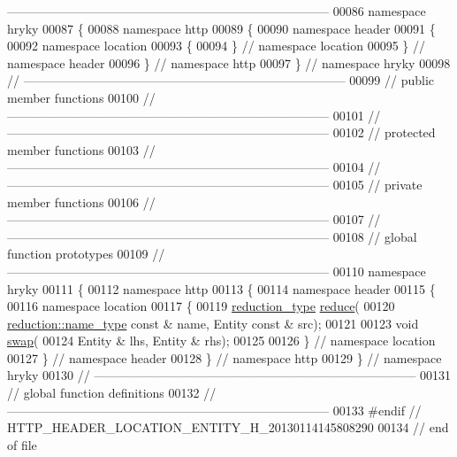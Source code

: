 \begin{DoxyCode}
{      ------------------------------------------------------------------------------}
00086 \textcolor{keyword}{namespace }hryky
00087 \{
00088 \textcolor{keyword}{namespace }http
00089 \{
00090 \textcolor{keyword}{namespace }header
00091 \{
00092 \textcolor{keyword}{namespace }location
00093 \{
00094 \} \textcolor{comment}{// namespace location}
00095 \} \textcolor{comment}{// namespace header}
00096 \} \textcolor{comment}{// namespace http}
00097 \} \textcolor{comment}{// namespace hryky}
00098 \textcolor{comment}{//
      ------------------------------------------------------------------------------}
00099 \textcolor{comment}{// public member functions}
00100 \textcolor{comment}{//
      ------------------------------------------------------------------------------}
00101 \textcolor{comment}{//
      ------------------------------------------------------------------------------}
00102 \textcolor{comment}{// protected member functions}
00103 \textcolor{comment}{//
      ------------------------------------------------------------------------------}
00104 \textcolor{comment}{//
      ------------------------------------------------------------------------------}
00105 \textcolor{comment}{// private member functions}
00106 \textcolor{comment}{//
      ------------------------------------------------------------------------------}
00107 \textcolor{comment}{//
      ------------------------------------------------------------------------------}
00108 \textcolor{comment}{// global function prototypes}
00109 \textcolor{comment}{//
      ------------------------------------------------------------------------------}
00110 \textcolor{keyword}{namespace }hryky
00111 \{
00112 \textcolor{keyword}{namespace }http
00113 \{
00114 \textcolor{keyword}{namespace }header
00115 \{
00116 \textcolor{keyword}{namespace }location
00117 \{
00119     \hyperlink{namespacehryky_a343a9a4c36a586be5c2693156200eadc}{reduction_type} \hyperlink{namespacehryky_1_1http_a08fc36a78a8e2908140fcd102829a566}{reduce}(
00120         \hyperlink{namespacehryky_1_1reduction_ac686c30a4c8d196bbd0f05629a6b921f}{reduction::name_type} \textcolor{keyword}{const} & name, Entity \textcolor{keyword}{const} & src);
00121 
00123     \textcolor{keywordtype}{void} \hyperlink{namespacehryky_1_1http_a38e62595ad532d18fbc65ceb61973aec}{swap}(
00124         Entity & lhs, Entity & rhs);
00125 
00126 \} \textcolor{comment}{// namespace location}
00127 \} \textcolor{comment}{// namespace header}
00128 \} \textcolor{comment}{// namespace http}
00129 \} \textcolor{comment}{// namespace hryky}
00130 \textcolor{comment}{//
      ------------------------------------------------------------------------------}
00131 \textcolor{comment}{// global function definitions}
00132 \textcolor{comment}{//
      ------------------------------------------------------------------------------}
00133 \textcolor{preprocessor}{#endif // HTTP\_HEADER\_LOCATION\_ENTITY\_H\_20130114145808290}
00134 \textcolor{preprocessor}{}\textcolor{comment}{// end of file}
\end{DoxyCode}

